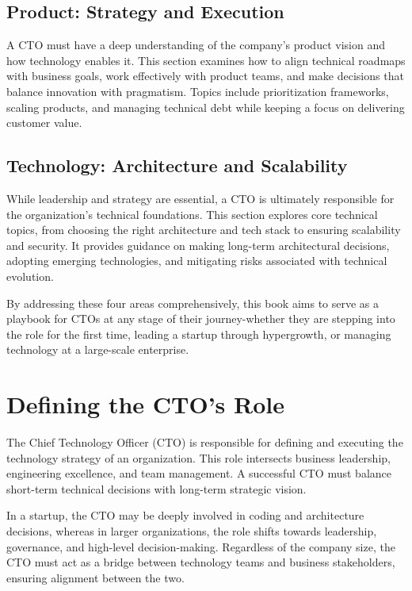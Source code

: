 \subsection{Product: Strategy and Execution}

A CTO must have a deep understanding of the company's product vision and how technology enables it. This section examines how to align technical roadmaps with business goals, work effectively with product teams, and make decisions that balance innovation with pragmatism. Topics include prioritization frameworks, scaling products, and managing technical debt while keeping a focus on delivering customer value.

\subsection{Technology: Architecture and Scalability}

While leadership and strategy are essential, a CTO is ultimately responsible for the organization's technical foundations. This section explores core technical topics, from choosing the right architecture and tech stack to ensuring scalability and security. It provides guidance on making long-term architectural decisions, adopting emerging technologies, and mitigating risks associated with technical evolution.

By addressing these four areas comprehensively, this book aims to serve as a playbook for CTOs at any stage of their journey-whether they are stepping into the role for the first time, leading a startup through hypergrowth, or managing technology at a large-scale enterprise.

\section{Defining the CTO's Role}

The Chief Technology Officer (CTO) is responsible for defining and executing the technology strategy of an organization. This role intersects business leadership, engineering excellence, and team management. A successful CTO must balance short-term technical decisions with long-term strategic vision.

In a startup, the CTO may be deeply involved in coding and architecture decisions, whereas in larger organizations, the role shifts towards leadership, governance, and high-level decision-making. Regardless of the company size, the CTO must act as a bridge between technology teams and business stakeholders, ensuring alignment between the two.

